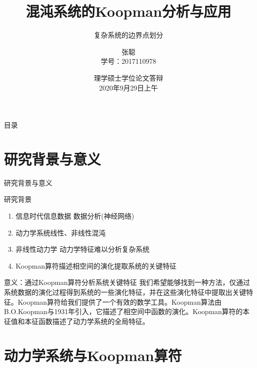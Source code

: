 \documentclass{beamer}
\title[混沌系统的Koopman分析与应用]{\LARGE 混沌系统的Koopman分析与应用}
\subtitle{复杂系统的边界点划分}
\author{张聪\\学号：2017110978}
\institute[系统科学]{导师：兰岳恒\\北京邮电大学理学院}
\date[理学硕士学位论文答辩]{理学硕士学位论文答辩\\[0.5em] \small 2020年9月29日上午}
\begin{document}
\kaishu

\begin{frame}
\titlepage
\end{frame}

\begin{frame}{目录}
\tableofcontents%
\end{frame}

\section{研究背景与意义}
		\begin{frame}{研究背景与意义}
	\begin{block}{研究背景}
		\begin{enumerate}
			\item 信息时代\textrightarrow 信息\textrightarrow 数据 \textrightarrow 数据分析(神经网络)
			\item 动力学系统\textrightarrow 线性、非线性\textrightarrow 混沌
			\item 非线性动力学 \textrightarrow 动力学特征\textrightarrow 难以分析复杂系统
			\item Koopman算符\textrightarrow 描述相空间的演化\textrightarrow 提取系统的关键特征
		\end{enumerate}
	\end{block}
	\begin{block}{意义：通过Koopman算符分析系统关键特征}
		\indent 我们希望能够找到一种方法，仅通过系统数据的演化过程得到系统的一些演化特征，并在这些演化特征中提取出关键特征。Koopman算符给我们提供了一个有效的数学工具。Koopman算法由B.O.Koopman与1931年引入，它描述了相空间中函数的演化。Koopman算符的本征值和本征函数描述了动力学系统的全局特征。
	\end{block}
\end{frame}
		
\section{动力学系统与Koopman算符}
\end{document}
